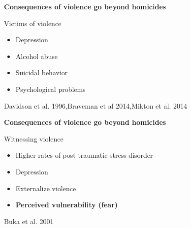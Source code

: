 \documentclass[xcolor={dvipsnames}]{beamer}
\begin{document}
\begin{frame}
	\LARGE{
		\begin{center}
			\textbf{Consequences of violence go beyond homicides}
		\end{center}
	
	\pause
	
	Victims of violence
	\begin{itemize}
		
		\item Depression

		\item Alcohol abuse
		
		\item Suicidal behavior
		
		\item Psychological problems
						
	\end{itemize}	
	
		}
		\tiny{Davidson et al. 1996,Braveman et al 2014,Mikton et al. 2014}
\end{frame}


\begin{frame}
	\LARGE{
		\begin{center}
			\textbf{Consequences of violence go beyond homicides}
		\end{center}
	
	Witnessing violence
	
		\begin{itemize}
		
		\item Higher rates of post-traumatic stress disorder

		\item Depression 
		
		\item Externalize violence
		
		\item \textbf{Perceived vulnerability (fear)} 
						
	\end{itemize}
	
		}
		\tiny{Buka et al. 2001}
\end{frame}
\end{document}
